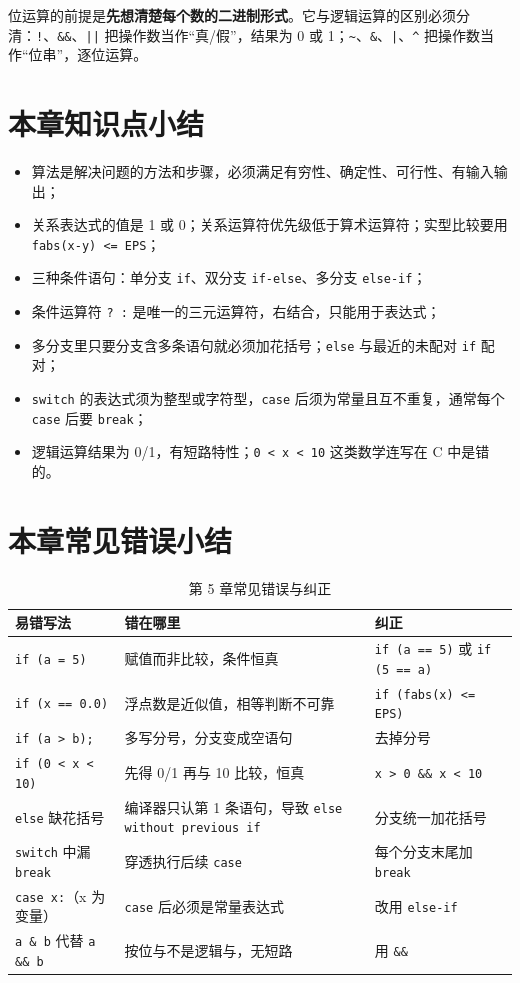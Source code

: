 位运算的前提是\textbf{先想清楚每个数的二进制形式}。它与逻辑运算的区别必须分清：\texttt{!}、\texttt{\&\&}、\texttt{||} 把操作数当作“真/假”，结果为 0 或 1；\texttt{\textasciitilde}、\texttt{\&}、\texttt{|}、\texttt{\^{}} 把操作数当作“位串”，逐位运算。

\section{本章知识点小结}

\begin{itemize}
  \item 算法是解决问题的方法和步骤，必须满足有穷性、确定性、可行性、有输入输出；
  \item 关系表达式的值是 1 或 0；关系运算符优先级低于算术运算符；实型比较要用 \texttt{fabs(x-y) <= EPS}；
  \item 三种条件语句：单分支 \texttt{if}、双分支 \texttt{if-else}、多分支 \texttt{else-if}；
  \item 条件运算符 \texttt{? :} 是唯一的三元运算符，右结合，只能用于表达式；
  \item 多分支里只要分支含多条语句就必须加花括号；\texttt{else} 与最近的未配对 \texttt{if} 配对；
  \item \texttt{switch} 的表达式须为整型或字符型，\texttt{case} 后须为常量且互不重复，通常每个 \texttt{case} 后要 \texttt{break}；
  \item 逻辑运算结果为 0/1，有短路特性；\texttt{0 < x < 10} 这类数学连写在 C 中是错的。
\end{itemize}

\section{本章常见错误小结}

\begin{table}[htbp]
\centering
\caption{第 5 章常见错误与纠正}
\small
\begin{tabularx}{\textwidth}{@{}lXl@{}}
\toprule
易错写法 & 错在哪里 & 纠正 \\
\midrule
\texttt{if (a = 5)} & 赋值而非比较，条件恒真 & \texttt{if (a == 5)} 或 \texttt{if (5 == a)} \\
\texttt{if (x == 0.0)} & 浮点数是近似值，相等判断不可靠 & \texttt{if (fabs(x) <= EPS)} \\
\texttt{if (a > b);} & 多写分号，分支变成空语句 & 去掉分号 \\
\texttt{if (0 < x < 10)} & 先得 0/1 再与 10 比较，恒真 & \texttt{x > 0 \&\& x < 10} \\
\texttt{else} 缺花括号 & 编译器只认第 1 条语句，导致 \texttt{else without previous if} & 分支统一加花括号 \\
\texttt{switch} 中漏 \texttt{break} & 穿透执行后续 \texttt{case} & 每个分支末尾加 \texttt{break} \\
\texttt{case x:}（x 为变量） & \texttt{case} 后必须是常量表达式 & 改用 \texttt{else-if} \\
\texttt{a \& b} 代替 \texttt{a \&\& b} & 按位与不是逻辑与，无短路 & 用 \texttt{\&\&} \\
\bottomrule
\end{tabularx}
\end{table}
